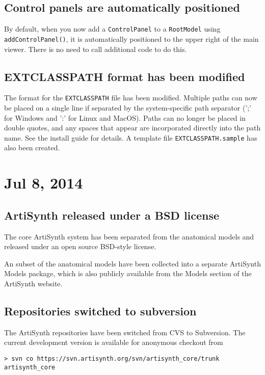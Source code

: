\documentclass{article}
\begin{document}
\subsection*{Control panels are automatically positioned}

By default, when you now add a {\tt ControlPanel} to a {\tt RootModel}
using {\tt addControlPanel()}, it is automatically positioned to the
upper right of the main viewer.  There is no need to call additional
code to do this.

\subsection*{EXTCLASSPATH format has been modified}

The format for the {\tt EXTCLASSPATH} file has been modified. Multiple
paths can now be placed on a single line if separated by the
system-specific path separator (';' for Windows and ':' for Linux and
MacOS). Paths can no longer be placed in double quotes, and any spaces
that appear are incorporated directly into the path name. See the
install guide for details. A template file {\tt EXTCLASSPATH.sample}
has also been created.

\section*{Jul 8, 2014}

\subsection*{ArtiSynth released under a BSD license}

The core ArtiSynth system has been separated from the anatomical
models and released under an open source BSD-style license.

An subset of the anatomical models have been collected into a separate
ArtiSynth Models package, which is also publicly available from the
{\sf Models} section of the ArtiSynth website.

\subsection*{Repositories switched to subversion}

The ArtiSynth repositories have been switched from CVS to Subversion.
The current development version is available for anonymous checkout
from
\begin{verbatim}
> svn co https://svn.artisynth.org/svn/artisynth_core/trunk artisynth_core
\end{verbatim}
\end{document}
